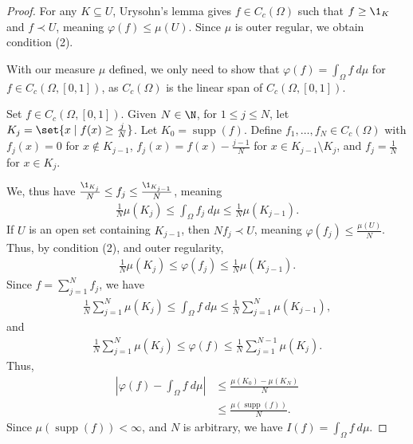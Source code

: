 \documentclass[10pt]{mypackage}
\DeclareMathOperator{\supp}{supp}
\begin{document}
\begin{proof}
  For any $K\subseteq U$, Urysohn's lemma gives $f\in C_c\left(\Omega\right)$ such that $f\geq \1_K$ and $f\prec U$, meaning $\varphi(f) \leq \mu(U)$. Since $\mu$ is outer regular, we obtain condition (2).\newline

  With our measure $\mu$ defined, we only need to show that $\varphi(f) = \int_{\Omega}f\:d\mu$ for $f\in C_c\left(\Omega,[0,1]\right)$, as $C_c\left(\Omega\right)$ is the linear span of $C_c\left(\Omega,[0,1]\right)$.\newline

  Set $f\in C_c\left(\Omega,[0,1]\right)$. Given $N\in \N$, for $1\leq j\leq N$, let $K_j = \set{x\mid f(x) \geq \frac{j}{N}}$. Let $K_0 = \supp(f)$. Define $f_1,\dots,f_N\in C_c\left(\Omega\right)$ with $f_j(x) = 0$ for $x\notin K_{j-1}$, $f_j(x) = f(x) - \frac{j-1}{N}$ for $x\in K_{j-1}\setminus K_j$, and $f_j = \frac{1}{N}$ for $x\in K_j$.\newline

  We, thus have $\frac{\1_{K_j}}{N} \leq f_j \leq \frac{\1_{K_{j-1}}}{N}$, meaning
  \begin{align*}
    \frac{1}{N}\mu\!\left(K_j\right) \leq \int_{\Omega}f_j\:d\mu \leq \frac{1}{N}\mu\!\left(K_{j-1}\right).
  \end{align*}
  If $U$ is an open set containing $K_{j-1}$, then $Nf_{j} \prec U$, meaning $\varphi\left(f_j\right) \leq \frac{\mu\!\left(U\right)}{N}$. Thus, by condition (2), and outer regularity,
  \begin{align*}
    \frac{1}{N}\mu\!\left(K_{j}\right) \leq \varphi\left(f_j\right) \leq \frac{1}{N}\mu\!\left(K_{j-1}\right).
  \end{align*}
  Since $f = \sum_{j=1}^{N} f_j$, we have
  \begin{align*}
    \frac{1}{N}\sum_{j=1}^{N}\mu\!\left(K_j\right) \leq \int_{\Omega}f\:d\mu \leq \frac{1}{N}\sum_{j=1}^{N}\mu\!\left(K_{j-1}\right),
  \end{align*}
  and
  \begin{align*}
    \frac{1}{N}\sum_{j=1}^{N}\mu\!\left(K_j\right) \leq \varphi(f)\leq \frac{1}{N}\sum_{j=1}^{N-1}\mu\!\left(K_j\right).
  \end{align*}
  Thus,
  \begin{align*}
    \left\vert \varphi(f) - \int_{\Omega}f\:d\mu \right\vert &\leq \frac{\mu\!\left(K_0\right) - \mu\!\left(K_{N}\right)}{N}\\
    &\leq \frac{\mu\!\left(\supp(f)\right)}{N}.
  \end{align*}
  Since $\mu\!\left(\supp(f)\right) < \infty$, and $N$ is arbitrary, we have $I(f) = \int_{\Omega}f\:d\mu$.
\end{proof}
\end{document}
